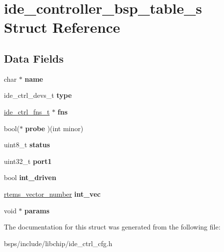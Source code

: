 \hypertarget{structide__controller__bsp__table__s}{}\section{ide\+\_\+controller\+\_\+bsp\+\_\+table\+\_\+s Struct Reference}
\label{structide__controller__bsp__table__s}
\subsection*{Data Fields}
\begin{DoxyCompactItemize}
\item 
\mbox{\label{structide__controller__bsp__table__s_a542e1f1fc87405f963b8a41a8e8ee1be}} 
char $\ast$ {\bfseries name}
\item 
\mbox{\label{structide__controller__bsp__table__s_a6f9b6ef5e306b7f01effad4ff173f1c4}} 
ide\+\_\+ctrl\+\_\+devs\+\_\+t {\bfseries type}
\item 
\mbox{\label{structide__controller__bsp__table__s_ae0042fc500d7565c2ba19fb4f9fc47cd}} 
\mbox{\hyperlink{structide__ctrl__fns__s}{ide\+\_\+ctrl\+\_\+fns\+\_\+t}} $\ast$ {\bfseries fns}
\item 
\mbox{\label{structide__controller__bsp__table__s_aeab9fd225d6349ae06dcd9be36f6920b}} 
bool($\ast$ {\bfseries probe} )(int minor)
\item 
\mbox{\label{structide__controller__bsp__table__s_ae1ae68796309d9bac9cf7682c7b27f3c}} 
uint8\+\_\+t {\bfseries status}
\item 
\mbox{\label{structide__controller__bsp__table__s_aa664305fe7bf860d119d4a86400887c0}} 
uint32\+\_\+t {\bfseries port1}
\item 
\mbox{\label{structide__controller__bsp__table__s_ae5df2216f8747f857f60067275d7499f}} 
bool {\bfseries int\+\_\+driven}
\item 
\mbox{\label{structide__controller__bsp__table__s_a8f91aa95443f037bd6a937d81d5d3536}} 
\mbox{\hyperlink{group__ClassicINTR_ga3e434c197d99f128e78cae4d9358bd8b}{rtems\+\_\+vector\+\_\+number}} {\bfseries int\+\_\+vec}
\item 
\mbox{\label{structide__controller__bsp__table__s_aec513085aa900d6be93ffe76360e0ec1}} 
void $\ast$ {\bfseries params}
\end{DoxyCompactItemize}


The documentation for this struct was generated from the following file\+:\begin{DoxyCompactItemize}
\item 
bsps/include/libchip/ide\+\_\+ctrl\+\_\+cfg.\+h\end{DoxyCompactItemize}
